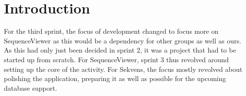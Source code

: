 \section{Introduction}
For the third sprint, the focus of development changed to focus more on SequenceViewer as this would be a dependency for other groups as well as ours. As this had only just been decided in sprint 2, it was a project that had to be started up from scratch. For SequenceViewer, sprint 3 thus revolved around setting up the core of the activity. For Sekvens, the focus mostly revolved about polishing the application, preparing it as well as possible for the upcoming database support.